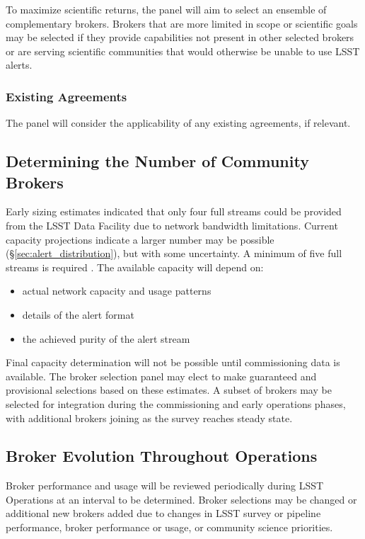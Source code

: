 To maximize scientific returns, the panel will aim to select an ensemble of complementary brokers.
Brokers that are more limited in scope or scientific goals may be selected if they provide capabilities not present in other selected brokers or are serving scientific communities that would otherwise be unable to use LSST alerts.

\subsubsection{Existing Agreements}

The panel will consider the applicability of any existing agreements, if relevant.

\subsection{Determining the Number of Community Brokers} \label{sec:numbrokers}

Early sizing estimates indicated that only four full streams could be provided from the LSST Data Facility due to network bandwidth limitations.
Current capacity projections indicate a larger number may be possible (\S \ref{sec:alert_distribution}), but with some uncertainty.
A minimum of five full streams is required .
The available capacity will depend on:

\begin{itemize}
	\item actual network capacity and usage patterns
	\item details of the alert format
	\item the achieved purity of the alert stream
\end{itemize}

Final capacity determination will not be possible until commissioning data is available.
The broker selection panel may elect to make guaranteed and provisional selections based on these estimates.
A subset of brokers may be selected for integration during the commissioning and early operations phases, with additional brokers joining as the survey reaches steady state.


\subsection{Broker Evolution Throughout Operations}

Broker performance and usage will be reviewed periodically during LSST Operations at an interval to be determined.
Broker selections may be changed or additional new brokers added due to changes in LSST survey or pipeline performance, broker performance or usage, or community science priorities.

